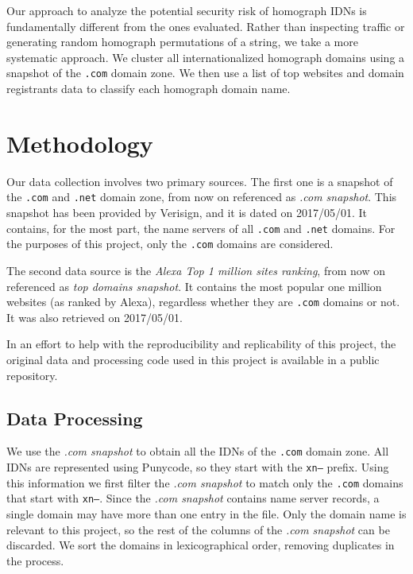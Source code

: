 \documentclass[letterpaper,twocolumn,10pt]{article}
\begin{document}
Our approach to analyze the potential security risk of homograph IDNs is fundamentally different from the ones evaluated.
Rather than inspecting traffic or generating random homograph permutations of a string, we take a more systematic approach.
We cluster all internationalized homograph domains using a snapshot of the \texttt{.com} domain zone.
We then use a list of top websites and domain registrants data to classify each homograph domain name.

\section{Methodology}
Our data collection involves two primary sources.
The first one is a snapshot of the \texttt{.com} and \texttt{.net} domain zone, from now on referenced as \textit{.com snapshot}.
This snapshot has been provided by Verisign, and it is dated on 2017/05/01.
It contains, for the most part, the name servers of all \texttt{.com} and \texttt{.net} domains.
For the purposes of this project, only the \texttt{.com} domains are considered.

The second data source is the \textit{Alexa Top 1 million sites ranking}, from now on referenced as \textit{top domains snapshot}.
It contains the most popular one million websites (as ranked by Alexa), regardless whether they are \texttt{.com} domains or not.
It was also retrieved on 2017/05/01.

In an effort to help with the reproducibility and replicability of this project, the original data and processing code used in this project is available in a public repository.

\subsection{Data Processing}
We use the \textit{.com snapshot} to obtain all the IDNs of the \texttt{.com} domain zone.
All IDNs are represented using Punycode, so they start with the \texttt{xn--} prefix.
Using this information we first filter the \textit{.com snapshot} to match only the \texttt{.com} domains that start with \texttt{xn--}.
Since the \textit{.com snapshot} contains name server records, a single domain may have more than one entry in the file.
Only the domain name is relevant to this project, so the rest of the columns of the \textit{.com snapshot} can be discarded.
We sort the domains in lexicographical order, removing duplicates in the process.
\end{document}
